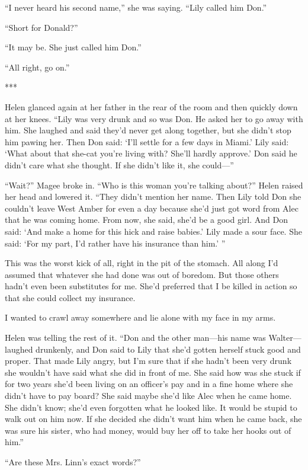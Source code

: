 \documentclass{novel}
\begin{document}
“I never heard his second name,” she was saying. “Lily called him Don.”

“Short for Donald?”

“It may be. She just called him Don.”

“All right, go on.”

***

Helen glanced again at her father in the rear of the room and then quickly down at her knees. “Lily was very drunk and so was Don. He asked her to go away with him. She laughed and said they’d never get along together, but she didn’t stop him pawing her. Then Don said: ‘I’ll settle for a few days in Miami.’ Lily said: ‘What about that she-cat you’re living with? She’ll hardly approve.’ Don said he didn’t care what she thought. If she didn’t like it, she could—”

“Wait?” Magee broke in. “Who is this woman you’re talking about?” Helen raised her head and lowered it. “They didn’t mention her name. Then Lily told Don she couldn’t leave West Amber for even a day because she’d just got word from Alec that he was coming home. From now, she said, she’d be a good girl. And Don said: ‘And make a home for this hick and raise babies.’ Lily made a sour face. She said: ‘For my part, I’d rather have his insurance than him.’ ”

This was the worst kick of all, right in the pit of the stomach. All along I’d assumed that whatever she had done was out of boredom. But those others hadn’t even been substitutes for me. She’d preferred that I be killed in action so that she could collect my insurance.

I wanted to crawl away somewhere and lie alone with my face in my arms.

Helen was telling the rest of it. “Don and the other man—his name was Walter—laughed drunkenly, and Don said to Lily that she’d gotten herself stuck good and proper. That made Lily angry, but I’m sure that if she hadn’t been very drunk she wouldn’t have said what she did in front of me. She said how was she stuck if for two years she’d been living on an officer’s pay and in a fine home where she didn’t have to pay board? She said maybe she’d like Alec when he came home. She didn’t know; she’d even forgotten what he looked like. It would be stupid to walk out on him now. If she decided she didn’t want him when he came back, she was sure his sister, who had money, would buy her off to take her hooks out of him.”

“Are these Mrs. Linn’s exact words?”
\end{document}
